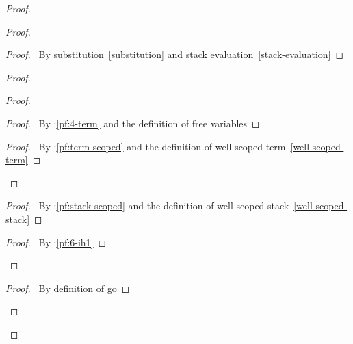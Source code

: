 \documentclass[a4paper]{article}
\begin{document}
\begin{proof}
{{\begin{pfenum}
                      \end{pfenum}}}
  \begin{proof}
    \begin{proof}
      \pf\ By substitution~\ref{substitution} and stack evaluation~\ref{stack-evaluation}
    \end{proof}
    \begin{proof}
      \begin{proof}
        \begin{proof}
          \pf\ By :\ref{pf:4-term} and the definition of free variables
        \end{proof}
        \qedstep
        \begin{proof}
          \pf\ By \toplevel:\ref{pf:term-scoped} and the definition of well scoped term~\ref{well-scoped-term}
        \end{proof}
      \end{proof}
      \begin{proof}
        \pf\ By \toplevel:\ref{pf:stack-scoped} and the definition of well scoped stack~\ref{well-scoped-stack}
      \end{proof}
      \qedstep
      \begin{proof}
        \pf\ By :\ref{pf:6-ih1}
      \end{proof}
    \end{proof}
    \begin{proof}
      \pf\ By definition of \textsf{go}
    \end{proof}

\end{proof}
\end{proof}
\end{document}
